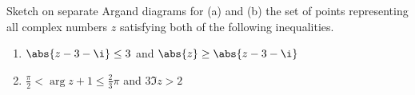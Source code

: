 \begin{solution}
\begin{ppart}
\begin{center}
        \end{center}
    \end{ppart}
\end{solution}

\begin{problem}
    Sketch on separate Argand diagrams for (a) and (b) the set of points representing all complex numbers $z$ satisfying both of the following inequalities.

    \begin{enumerate}
        \item $\abs{z - 3 - \i} \leq 3$ and $\abs{z} \geq \abs{z - 3 - \i}$
        \item $\frac\pi2 < \arg{z + 1} \leq \frac23 \pi$ and $3 \Im{z} > 2$
    \end{enumerate}
\end{problem}
